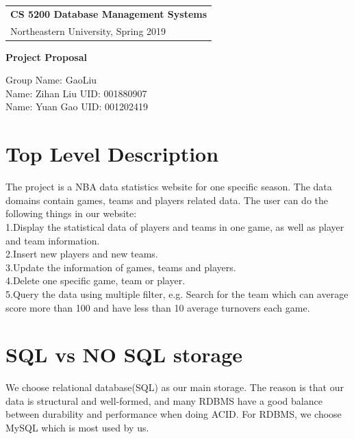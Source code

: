 \documentclass[a4paper,12pt]{article} %
\begin{document}
\thispagestyle{empty} %

\begin{tabular}{p{15.5cm}} %
{\large \bf CS 5200 Database Management Systems} \\
Northeastern University, Spring 2019  \\
\hline %
\end{tabular} %

\vspace*{0.3cm} %

\begin{center} %
    {\Large \bf Project Proposal} %
    \vspace{2mm}
    
    {Group Name: GaoLiu}\\
    {Name: Zihan Liu UID: 001880907}\\
    {Name: Yuan Gao UID: 001202419}
\end{center} 
%
\vspace{0.2cm}
\section{Top Level Description}
The project is a NBA data statistics website for one specific season. 
The data domains contain games, teams and players related data. The user can do the following things in our website:\\
1.Display the statistical data of players and teams in one game, as well as player and team information.\\
2.Insert new players and new teams.\\
3.Update the information of games, teams and players.\\
4.Delete one specific game, team or player.\\
5.Query the data using multiple filter, e.g. Search for the team which can average score more than 100 and have less
than 10 average turnovers each game.
\section{SQL vs NO SQL storage}
We choose relational database(SQL) as our main storage. The reason is that our data is structural and 
well-formed, and many RDBMS have a good balance between durability and performance when doing ACID. 
For RDBMS, we choose MySQL which is most used by us.
\end{document}

